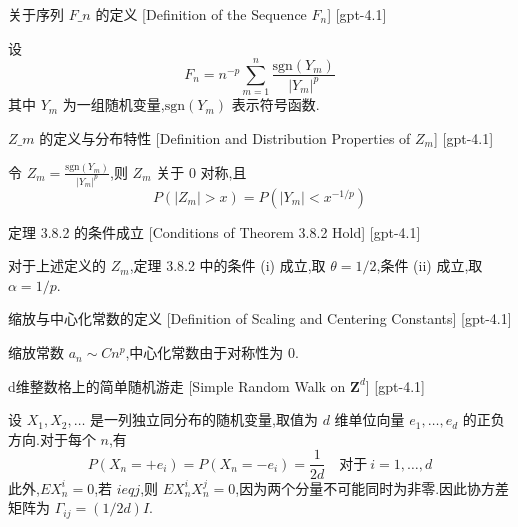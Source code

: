 \documentclass[UTF8]{ctexart}
\begin{document}
    
    
    \begin{dfn}
        {关于序列 $F\_n$ 的定义}
        [Definition of the Sequence $F_n$]
        [gpt-4.1]
        
设
\[
F_n = n^{-p} \sum_{m=1}^n \frac{\mathrm{sgn}(Y_m)}{|Y_m|^p}
\]
其中 $Y_m$ 为一组随机变量,$\mathrm{sgn}(Y_m)$ 表示符号函数.

    \end{dfn}
    
    
    
    \begin{dfn}
        {$Z\_m$ 的定义与分布特性}
        [Definition and Distribution Properties of $Z_m$]
        [gpt-4.1]
        
令 $Z_m = \frac{\mathrm{sgn}(Y_m)}{|Y_m|^p}$,则 $Z_m$ 关于 0 对称,且
\[
P(|Z_m| > x) = P(|Y_m| < x^{-1/p})
\]

    \end{dfn}
    
    
    
    \begin{thm}
        {定理 3.8.2 的条件成立}
        [Conditions of Theorem 3.8.2 Hold]
        [gpt-4.1]
        
对于上述定义的 $Z_m$,定理 3.8.2 中的条件 (i) 成立,取 $\theta = 1/2$,条件 (ii) 成立,取 $\alpha = 1/p$.

    \end{thm}
    
    
    
    \begin{dfn}
        {缩放与中心化常数的定义}
        [Definition of Scaling and Centering Constants]
        [gpt-4.1]
        
缩放常数 $a_n \sim C n^p$,中心化常数由于对称性为 0.

    \end{dfn}
    
    
    
    \begin{xmp}
        {d维整数格上的简单随机游走}
        [Simple Random Walk on $\mathbf{Z}^d$]
        [gpt-4.1]
        
设 $X_1, X_2, \ldots$ 是一列独立同分布的随机变量,取值为 $d$ 维单位向量 $e_1, \ldots, e_d$ 的正负方向.对于每个 $n$,有
\[
P(X_n = +e_i) = P(X_n = -e_i) = \frac{1}{2d} \quad \mathrm{对于}~i = 1, \ldots, d
\]
此外,$E X_n^i = 0$,若 $i 
eq j$,则 $E X_n^i X_n^j = 0$,因为两个分量不可能同时为非零.因此协方差矩阵为 $\Gamma_{ij} = (1/2d) I$.

    \end{xmp}
    
\end{document}
